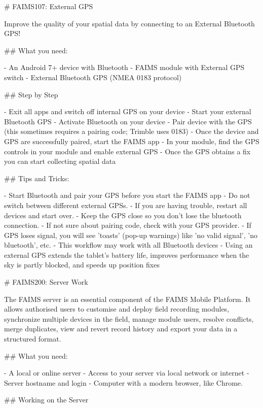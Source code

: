 # FAIMS107: External GPS

Improve the quality of your spatial data by connecting to an External Bluetooth GPS!

## What you need:

-  An Android 7+ device with Bluetooth
-  FAIMS module with External GPS switch
-  External Bluetooth GPS (NMEA 0183 protocol)



## Step by Step

-  Exit all apps and switch off internal GPS on your device
-  Start your external Bluetooth GPS
-  Activate Bluetooth on your device
-  Pair device with the GPS (this sometimes requires a pairing code; Trimble uses 0183)
-  Once the device and GPS are successfully paired, start the FAIMS app
-  In your module, find the GPS controls in your module and enable external GPS
-  Once the GPS obtains a fix you can start collecting spatial data




## Tips and Tricks:

-  Start Bluetooth and pair your GPS before you start the FAIMS app
-  Do not switch between different external GPSs. 
-  If you are having trouble, restart all devices and start over.
-  Keep the GPS close so you don’t lose the bluetooth connection.
-  If not sure about pairing code, check with your GPS provider.
-  If GPS loses signal, you will see 'toasts' (pop-up warnings) like 'no valid signal', 'no bluetooth', etc. 
-  This workflow may work with all Bluetooth devices
-  Using an external GPS extends the tablet’s battery life, improves performance when the sky is partly blocked, and speeds up position fixes






# FAIMS200: Server Work


The FAIMS server is an essential component of the FAIMS Mobile Platform. It allows authorised users to customise and deploy field recording modules, synchronize multiple devices in the field, manage module users, resolve conflicts, merge duplicates, view and revert record history and export your data in a structured format.
 
## What you need:

-  A local or online server
-  Access to your server via local network or internet
-  Server hostname and login
-  Computer with a modern browser, like Chrome.


## Working on the Server

